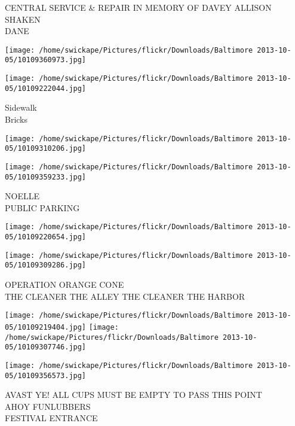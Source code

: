 \documentclass[10pt,letterpaper]{article}
\begin{document}
CENTRAL SERVICE \& REPAIR IN MEMORY OF DAVEY ALLISON\\
SHAKEN\\
DANE\\
\pagebreak

\texttt{[image: /home/swickape/Pictures/flickr/Downloads/Baltimore 2013-10-05/10109360973.jpg]}

\vspace{0.25in}
\texttt{[image: /home/swickape/Pictures/flickr/Downloads/Baltimore 2013-10-05/10109222044.jpg]}

Sidewalk\\
Bricks\\
\pagebreak

\texttt{[image: /home/swickape/Pictures/flickr/Downloads/Baltimore 2013-10-05/10109310206.jpg]}

\vspace{0.25in}
\texttt{[image: /home/swickape/Pictures/flickr/Downloads/Baltimore 2013-10-05/10109359233.jpg]}

NOELLE\\
PUBLIC PARKING\\
\pagebreak

\texttt{[image: /home/swickape/Pictures/flickr/Downloads/Baltimore 2013-10-05/10109220654.jpg]}

\vspace{0.25in}
\texttt{[image: /home/swickape/Pictures/flickr/Downloads/Baltimore 2013-10-05/10109309286.jpg]}

OPERATION ORANGE CONE\\
THE CLEANER THE ALLEY THE CLEANER THE HARBOR\\
\pagebreak

\texttt{[image: /home/swickape/Pictures/flickr/Downloads/Baltimore 2013-10-05/10109219404.jpg]}
\texttt{[image: /home/swickape/Pictures/flickr/Downloads/Baltimore 2013-10-05/10109307746.jpg]}

\vspace{0.25in}
\texttt{[image: /home/swickape/Pictures/flickr/Downloads/Baltimore 2013-10-05/10109356573.jpg]}

AVAST YE! ALL CUPS MUST BE EMPTY TO PASS THIS POINT\\
AHOY FUNLUBBERS\\
FESTIVAL ENTRANCE\\
\pagebreak
\end{document}
